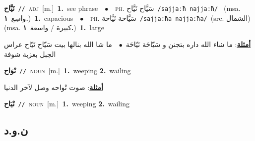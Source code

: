 \documentclass[10pt,a4paper,twoside]{article} %
\begin{document}
\begin{multicols}{2}
{\setlength\topsep{0pt}\textbf{\foreignlanguage{arabic}{نَيَّاح}}\ {\color{gray}\texttt{//}\color{black}}\ \textsc{adj}\ [m.]\ \textbf{1.}~see phrase\ \ $\bullet$\ \ \textsc{ph.} \color{gray} \foreignlanguage{arabic}{سَيَّاح نَيَّاح}\color{black}\ {\color{gray}\texttt{/{\sffamily sajjaːħ najjaːħ}/}\color{black}}\ \color{gray} (msa. \foreignlanguage{arabic}{واسِع}~\foreignlanguage{arabic}{\textbf{١.}})\color{black}\ \textbf{1.}~capacious\ \ $\bullet$\ \ \textsc{ph.} \color{gray} \foreignlanguage{arabic}{سَيَّاحة نَيَّاحة}\color{black}\ {\color{gray}\texttt{/{\sffamily sajjaːħa najjaːħa}/}\color{black}}\ \color{gray}(src. \foreignlanguage{arabic}{الشمال})\color{black}\ \color{gray} (msa. \foreignlanguage{arabic}{كبيرة / واسعة}~\foreignlanguage{arabic}{\textbf{١.}})\color{black}\ \textbf{1.}~large\  \begin{flushright}\color{gray}\foreignlanguage{arabic}{\textbf{\underline{\foreignlanguage{arabic}{أمثلة}}}: ما شاء الله داره بتجنن و سَيّاحَة نَيّاحَة\ $\bullet$\ \  ما شا الله بنالها بيت سَيّاح نَيّاح عراس الجبل بعزبة شوفة}\end{flushright}\color{black}} \vspace{2mm}

{\setlength\topsep{0pt}\textbf{\foreignlanguage{arabic}{نْوَاح}}\ {\color{gray}\texttt{//}\color{black}}\ \textsc{noun}\ [m.]\ \textbf{1.}~weeping  \textbf{2.}~wailing\  \begin{flushright}\color{gray}\foreignlanguage{arabic}{\textbf{\underline{\foreignlanguage{arabic}{أمثلة}}}: صوت نْواحه وصل لآخر الدنيا}\end{flushright}\color{black}} \vspace{2mm}

{\setlength\topsep{0pt}\textbf{\foreignlanguage{arabic}{نْيَاح}}\ {\color{gray}\texttt{//}\color{black}}\ \textsc{noun}\ [m.]\ \textbf{1.}~weeping  \textbf{2.}~wailing\ } \vspace{2mm}

\vspace{-3mm}
\subsection*{\color{blue}\foreignlanguage{arabic}{ن.و.د}\color{blue}{}} 


\end{multicols}
\end{document}
